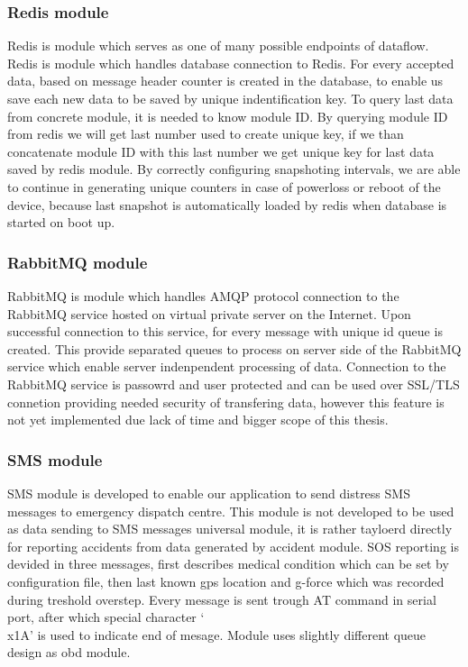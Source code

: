 \subsubsection{Redis module} %
\label{ssub:redis_module}
Redis is module which serves as one of many possible endpoints of dataflow. Redis is module which handles database connection to Redis. For every accepted data, based on message header counter is created in the database, to enable us save each new data to be saved by unique indentification key. To query last data from concrete module, it is needed to know module ID. By querying module ID from redis we will get last number used to create unique key, if we than concatenate module ID with this last number we get unique key for last data saved by redis module. By correctly configuring snapshoting intervals, we are able to continue in generating unique counters in case of powerloss or reboot of the device, because last snapshot is automatically loaded by redis when database is started on boot up.
\subsubsection{RabbitMQ module} %
\label{ssub:rabbitmq_module}
RabbitMQ is module which handles AMQP protocol connection to the RabbitMQ service hosted on virtual private server on the Internet. Upon successful connection to this service, for every message with unique id queue is created. This provide separated queues to process on server side of the RabbitMQ service which enable server indenpendent processing of data. Connection to the RabbitMQ service is passowrd and user protected and can be used over SSL/TLS connetion providing needed security of transfering data, however this feature is not yet implemented due lack of time and bigger scope of this thesis.
\subsubsection{SMS module} %
\label{ssub:sms_module}
SMS module is developed to enable our application to send distress SMS messages to emergency dispatch centre. This module is not developed to be used as data sending to SMS messages universal module, it is rather tayloerd directly for reporting accidents from data generated by accident module. SOS reporting is devided in three messages, first describes medical condition which can be set by configuration file, then last known gps location and g-force which was recorded during treshold overstep. Every message is sent trough AT command in serial port, after which special character `\\x1A' is used to indicate end of mesage. Module uses slightly different queue design as \gls{obd} module.
